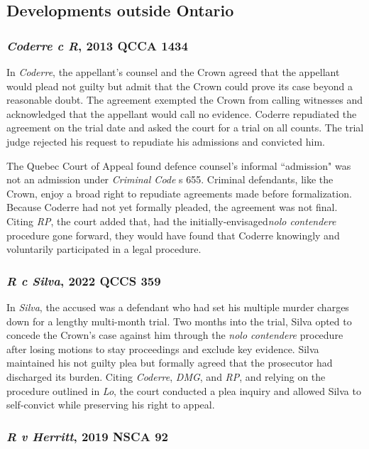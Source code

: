 \subsection{Developments outside Ontario}
\subsubsection{\textit{Coderre c R}, 2013 QCCA 1434}
In \textit{Coderre}, the appellant's counsel and the Crown agreed that the appellant would plead not guilty but admit that the Crown could prove its case beyond a reasonable doubt. The agreement exempted the Crown from calling witnesses and acknowledged that the appellant would call no evidence. Coderre repudiated the agreement on the trial date and asked the court for a trial on all counts. The trial judge rejected his request to repudiate his admissions and convicted him. 

The Quebec Court of Appeal found defence counsel's informal ``admission" was not an admission under \textit{Criminal Code} s 655. Criminal defendants, like the Crown, enjoy a broad right to repudiate agreements made before formalization. Because Coderre had not yet formally pleaded, the agreement was not final. Citing \textit{RP}, the court added that, had the initially-envisaged\textit{nolo contendere} procedure gone forward, they would have found that Coderre knowingly and voluntarily participated in a legal procedure.

\subsubsection{\textit{R c Silva}, 2022 QCCS 359}

In \textit{Silva}, the accused was a defendant who had set his multiple murder charges down for a lengthy multi-month trial. Two months into the trial, Silva opted to concede the Crown's case against him through the \textit{nolo contendere} procedure after losing motions to stay proceedings and exclude key evidence. Silva maintained his not guilty plea but formally agreed that the prosecutor had discharged its burden. Citing \textit{Coderre}, \textit{DMG}, and \textit{RP}, and relying on the procedure outlined in \textit{Lo}, the court conducted a plea inquiry and allowed Silva to self-convict while preserving his right to appeal.

\subsubsection{\textit{R v Herritt}, 2019 NSCA 92}

